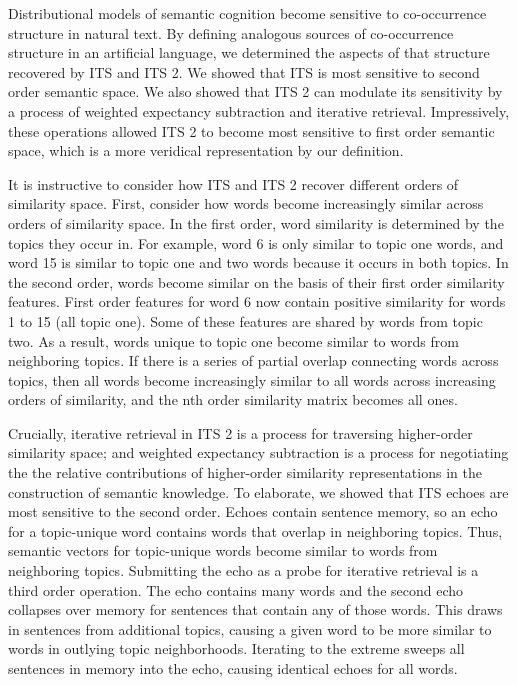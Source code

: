 \documentclass[10pt,letterpaper]{article}
\begin{document}
Distributional models of semantic cognition become sensitive to co-occurrence structure in natural text. By defining analogous sources of co-occurrence structure in an artificial language, we determined the aspects of that structure recovered by ITS and ITS 2. We showed that ITS is most sensitive to second order semantic space. We also showed that ITS 2 can modulate its sensitivity by a process of weighted expectancy subtraction and iterative retrieval. Impressively, these operations allowed ITS 2 to become most sensitive to first order semantic space, which is a more veridical representation by our definition.

It is instructive to consider how ITS and ITS 2 recover different orders of similarity space. First, consider how words become increasingly similar across orders of similarity space. In the first order, word similarity is determined by the topics they occur in. For example, word 6 is only similar to topic one words, and word 15 is similar to topic one and two words because it occurs in both topics. In the second order, words become similar on the basis of their first order similarity features. First order features for word 6 now contain positive similarity for words 1 to 15 (all topic one). Some of these features are shared by words from topic two. As a result, words unique to topic one become similar to words from neighboring topics. If there is a series of partial overlap connecting words across topics, then all words become increasingly similar to all words across increasing orders of similarity, and the nth order similarity matrix becomes all ones.

Crucially, iterative retrieval in ITS 2 is a process for traversing higher-order similarity space; and weighted expectancy subtraction is a process for negotiating the the relative contributions of higher-order similarity representations in the construction of semantic knowledge. To elaborate, we showed that ITS echoes are most sensitive to the second order. Echoes contain sentence memory, so an echo for a topic-unique word contains words that overlap in neighboring topics. Thus, semantic vectors for topic-unique words become similar to words from neighboring topics. Submitting the echo as a probe for iterative retrieval is a third order operation. The echo contains many words and the second echo collapses over memory for sentences that contain any of those words. This draws in sentences from additional topics, causing a given word to be more similar to words in outlying topic neighborhoods. Iterating to the extreme sweeps all sentences in memory into the echo, causing identical echoes for all words.
\end{document}
